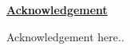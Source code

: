 \begin{center}
\underline{\textbf{\large Acknowledgement}}\\
\end{center}


\vspace{1cm}
Acknowledgement here..

